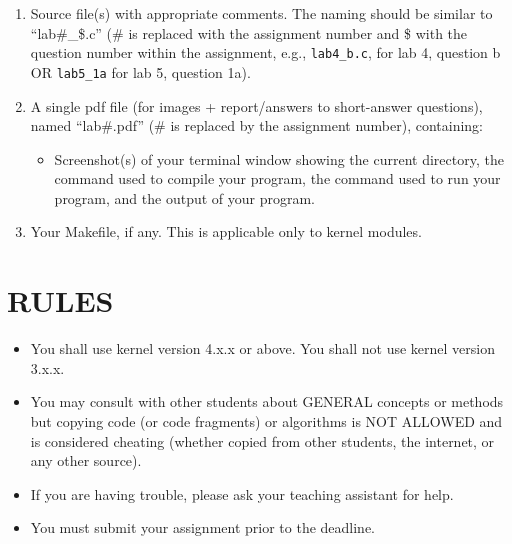 \documentclass{article}
\begin{document}
\begin{enumerate}
    \item Source file(s) with appropriate comments. The naming should be similar to “lab\#\_\$.c” (\# is replaced with the assignment number and \$ with the question number within the assignment, e.g., \texttt{lab4\_b.c}, for lab 4, question b OR \texttt{lab5\_1a} for lab 5, question 1a).
    \item A single pdf file (for images + report/answers to short-answer questions), named “lab\#.pdf” (\# is replaced by the assignment number), containing:
    \begin{itemize}
        \item Screenshot(s) of your terminal window showing the current directory, the command used to compile your program, the command used to run your program, and the output of your program.
    \end{itemize}
    \item Your Makefile, if any. This is applicable only to kernel modules.
\end{enumerate}

\section*{RULES}

\begin{itemize}
    \item You shall use kernel version 4.x.x or above. You shall not use kernel version 3.x.x.
    \item You may consult with other students about GENERAL concepts or methods but copying code (or code fragments) or algorithms is NOT ALLOWED and is considered cheating (whether copied from other students, the internet, or any other source).
    \item If you are having trouble, please ask your teaching assistant for help.
    \item You must submit your assignment prior to the deadline.
\end{itemize}
\end{document}

